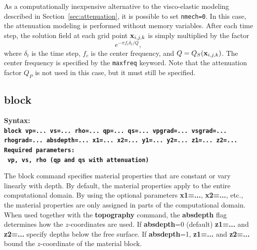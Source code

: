 \documentclass[11pt]{report}
\newcommand{\xb}{{\bf x}}
\begin{document}
As a computationally inexpensive alternative to the visco-elastic modeling described in
Section~\ref{sec:attenuation}, it is possible to set \verb+nmech=0+. In this case, the attenuation
modeling is performed without memory variables. After each time step, the solution field at each
grid point $\xb_{i,j,k}$ is simply multiplied by the factor
\[
e^{-\pi f_c \delta_t/Q},
\]
where $\delta_t$ is the time step, $f_c$ is the center frequency, and $Q=Q_S(\xb_{i,j,k})$. The
center frequency is specified by the \verb+maxfreq+ keyword. Note that the attenuation factor $Q_P$
is not used in this case, but it must still be specified.


\subsection{block}
\label{keyword:block}
\begin{flushleft}\bf
Syntax:\\
\tt block
vp=... vs=... rho=... qp=... qs=... vpgrad=... vsgrad=... rhograd=... absdepth=... x1=... x2=... y1=... y2=... z1=... z2=...\\
\bf
Required parameters:\\
\tt
vp, vs, rho  (qp and qs with attenuation)
\end{flushleft}
%
The block command specifies material properties that are constant or vary linearly with depth. By
default, the material properties apply to the entire computational domain. By using the optional
parameters {\bf x1=...}, {\bf x2=...}, etc., the material properties are only assigned in parts of
the computational domain. When used together with the {\bf topography} command, the {\bf absdepth}
flag determines how the $z$-coordinates are used. If {\bf absdepth}=0 (default) {\bf z1=...} and
{\bf z2=...} specify depths below the free surface. If {\bf absdepth}=1,  {\bf z1=...} and
{\bf z2=...} bound the $z$-coordinate of the material block.
\end{document}
